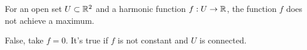 \documentclass{homework}
\begin{document}
                                                                                \begin{problem}\label{maximum-principle}For an open set
                                                                                  $U \subset \mathbb{R}^2$ and a harmonic function $f : U \to \mathbb{R}$, the
                                                                                        function $f$ does not achieve a maximum. %
                                                                                        \end{problem}
                                                                                        \begin{solution}
                                                                                        False, take $f=0$. It's true if $f$ is not constant and $U$ is connected.


\end{solution}
\end{document}
